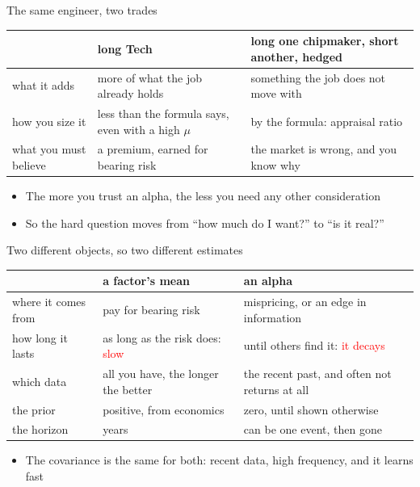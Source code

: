 \documentclass[aspectratio=169,10pt]{beamer}
\begin{document}
\begin{frame}{The same engineer, two trades}
\vskip 4pt
\begin{center}
\renewcommand{\arraystretch}{1.5}
\begin{tabular}{P{3.3cm}P{4.6cm}P{4.6cm}}
\toprule
 & \textbf{long Tech} & \textbf{long one chipmaker, short another, hedged} \\
\midrule
what it adds & more of what the job already holds & something the job does not move with \\
how you size it & less than the formula says, even with a high $\mu$ & by the formula: appraisal ratio \\
what you must believe & a premium, earned for bearing risk & the market is wrong, and you know why \\
\bottomrule
\end{tabular}
\end{center}
\vskip 14pt
\begin{itemize}
\item The more you trust an alpha, the less you need any other consideration
\vskip 6pt
\item So the hard question moves from ``how much do I want?'' to ``is it real?''
\end{itemize}
\end{frame}

\begin{frame}{Two different objects, so two different estimates}
\vskip 2pt
\begin{center}
\renewcommand{\arraystretch}{1.45}
\begin{tabular}{P{2.5cm}P{5.0cm}P{5.0cm}}
\toprule
 & \textbf{a factor's mean} & \textbf{an alpha} \\
\midrule
where it comes from & pay for bearing risk & mispricing, or an edge in information \\
how long it lasts & as long as the risk does: \textcolor{red}{slow} & until others find it: \textcolor{red}{it decays} \\
which data & all you have, the longer the better & the recent past, and often not returns at all \\
the prior & positive, from economics & zero, until shown otherwise \\
the horizon & years & can be one event, then gone \\
\bottomrule
\end{tabular}
\end{center}
\vskip 8pt
\begin{itemize}
\item The covariance is the same for both: recent data, high frequency, and it learns fast
\end{itemize}
\end{frame}
\end{document}
